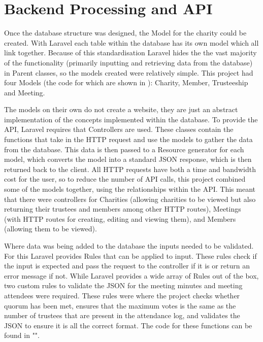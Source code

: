 \documentclass{UoYCSproject}
\begin{document}
\section{Backend Processing and API}
Once the database structure was designed, the Model for the charity could be created. With Laravel each table within the database has its own model which all link together. Because of this standardisation Laravel hides the the vast majority of the functionality (primarily inputting and retrieving data from the database) in Parent classes, so the models created were relatively simple. This project had four Models (the code for which are shown in ): Charity, Member, Trusteeship and Meeting. 

The models on their own do not create a website, they are just an abstract implementation of the concepts implemented within the database. To provide the API, Laravel requires that Controllers are used. These classes contain the functions that take in the HTTP request and use the models to gather the data from the database. This data is then passed to a Resource generator for each model, which converts the model into a standard JSON response, which is then returned back to the client. All HTTP requests have both a time and bandwidth cost for the user, so to reduce the number of API calls, this project combined some of the models together, using the relationships within the API. This meant that there were controllers for Charities (allowing charities to be viewed but also returning their trustees and members among other HTTP routes), Meetings (with HTTP routes for creating, editing and viewing them), and Members (allowing them to be viewed).

Where data was being added to the database the inputs needed to be validated. For this Laravel provides Rules that can be applied to input. These rules check if the input is expected and pass the request to the controller if it is or return an error message if not. While Laravel provides a wide array of Rules out of the box, two custom rules to validate the JSON for the meeting minutes and meeting attendees were required. These rules were where the project checks whether quorum has been met, ensures that the maximum votes is the same as the number of trustees that are present in the attendance log, and validates the JSON to ensure it is all the correct format. The code for these functions can be found in "". 
\end{document}
